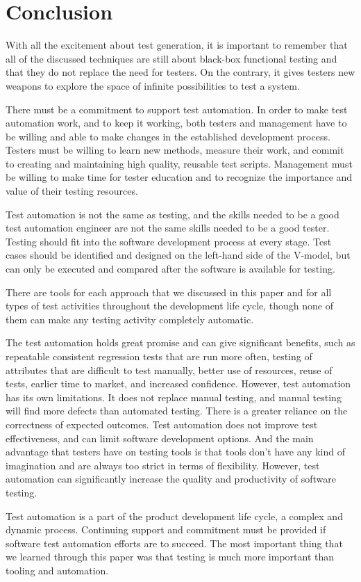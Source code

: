 \section{Conclusion}

With all the excitement about test generation, it is important to remember that
all of the discussed techniques are still about black-box functional testing and
that they do not replace the need for testers. On the contrary, it gives testers
new weapons to explore the space of infinite possibilities to test a system.

There must be a commitment to support test automation. In order to make test
automation work, and to keep it working, both testers and management have to be
willing and able to make changes in the established development process. Testers
must be willing to learn new methods, measure their work, and
commit to creating and maintaining high quality, reusable test scripts.
Management must be willing to make time for tester education and to
recognize the importance and value of their testing resources.

Test automation is not the same as testing, and the skills needed to be a
good test automation engineer are not the same skills needed to be a good tester.
Testing should fit into the software development process at every stage.
Test cases should be identified and designed on the left-hand side of the
V-model, but can only be executed and compared after the software is
available for testing.

There are tools for each approach that we discussed in this paper and for all
types of test activities throughout the development life cycle, though none of
them can make any testing activity completely automatic.

The test automation holds great promise and can give significant
benefits, such as repeatable consistent regression tests that are run more
often, testing of attributes that are difficult to test manually, better use of
resources, reuse of tests, earlier time to market, and increased confidence.
However, test automation has its own limitations. It does not replace manual
testing, and manual testing will find more defects than automated testing. There
is a greater reliance on the correctness of expected outcomes. Test automation
does not improve test effectiveness, and can limit software development options.
And the main advantage that testers have on testing tools is that tools don't
have any kind of imagination and are always too strict in terms of flexibility.
However, test automation can significantly increase the quality and productivity
of software testing.

Test automation is a part of the product development life cycle, a complex
and dynamic process. Continuing support and commitment must be provided if
software test automation efforts are to succeed. The most important thing that
we learned through this paper was that testing is much more important than
tooling and automation.
